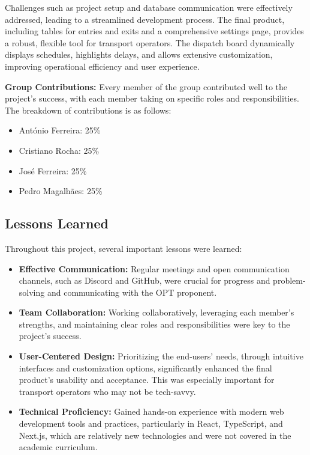 \documentclass[10pt]{article}
\begin{document}
        Challenges such as project setup and database communication were effectively addressed, leading to a streamlined development process. The final product, including tables for entries and exits and a comprehensive settings page, provides a robust, flexible tool for transport operators. The dispatch board dynamically displays schedules, highlights delays, and allows extensive customization, improving operational efficiency and user experience.


        \textbf{Group Contributions:}
        Every member of the group contributed well to the project's success, with each member taking on specific roles and responsibilities. The breakdown of contributions is as follows:
        \begin{itemize}
            \item António Ferreira: 25\%
            \item Cristiano Rocha: 25\%
            \item José Ferreira: 25\%
            \item Pedro Magalhães: 25\%
        \end{itemize}
         \subsection{Lessons Learned}

         Throughout this project, several important lessons were learned:
         
         \begin{itemize}
             \item \textbf{Effective Communication:} Regular meetings and open communication channels, such as Discord and GitHub, were crucial for progress and problem-solving and communicating with the OPT proponent.
             \item \textbf{Team Collaboration:} Working collaboratively, leveraging each member's strengths, and maintaining clear roles and responsibilities were key to the project's success.
             \item \textbf{User-Centered Design:} Prioritizing the end-users' needs, through intuitive interfaces and customization options, significantly enhanced the final product's usability and acceptance. This was especially important for transport operators who may not be tech-savvy.
             \item \textbf{Technical Proficiency:} Gained hands-on experience with modern web development tools and practices, particularly in React, TypeScript, and Next.js, which are relatively new technologies and were not covered in the academic curriculum.
         \end{itemize}
         
\end{document}

